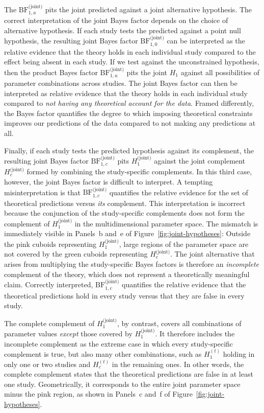 \documentclass[letterpaper,11pt,oneside]{article}
\begin{document}
The $\mathrm{BF}_{1,a}^{\text{(joint)}}$ pits the joint predicted against a joint alternative hypothesis. The correct interpretation of the joint Bayes factor depends on the choice of alternative hypothesis. If each study tests the predicted against a point null hypothesis, the resulting joint Bayes factor $\mathrm{BF}_{1,0}^{\text{(joint)}}$ can be interpreted as the relative evidence that the theory holds in each individual study compared to the effect being absent in each study. If we test against the unconstrained hypothesis, then the product Bayes factor $\mathrm{BF}_{1,u}^{\text{(joint)}}$ pits the joint $H_1$ against all possibilities of parameter combinations across studies. The joint Bayes factor can then be interpreted as relative evidence that the theory holds in each individual study compared to \textit{not having any theoretical account for the data}. Framed differently, the Bayes factor quantifies the degree to which imposing theoretical constraints improves our predictions of the data compared to not making any predictions at all.

Finally, if each study tests the predicted hypothesis against its complement, the resulting joint Bayes factor $\mathrm{BF}_{1,c}^{\text{(joint)}}$ pits $H_1^{\text{(joint)}}$ against the joint complement $H_c^{\text{(joint)}}$ formed by combining the study-specific complements. In this third case, however, the joint Bayes factor is difficult to interpret. A tempting misinterpretation is that $\mathrm{BF}_{1,c}^{\text{(joint)}}$ quantifies the relative evidence for the set of theoretical predictions versus \textit{its} complement. This interpretation is incorrect because the conjunction of the study-specific complements does not form the complement of $H_1^{\text{(joint)}}$ in the multidimensional parameter space. The mismatch is immediately visible in Panels~b and~e of Figure~\ref{fig:joint-hypotheses}: Outside the pink cuboids representing $H_1^{\text{(joint)}}$, large regions of the parameter space are not covered by the green cuboids representing $H_c^{\text{(joint)}}$. The joint alternative that arises from multiplying the study-specific Bayes factors is therefore an \textit{incomplete} complement of the theory, which does not represent a theoretically meaningful claim. Correctly interpreted, $\mathrm{BF}_{1,c}^{\text{(joint)}}$ quantifies the relative evidence that the theoretical predictions hold in every study versus that they are false in every study.

The complete complement of $H_1^{\text{(joint)}}$, by contrast, covers all combinations of parameter values \textit{except} those covered by $H_1^{\text{(joint)}}$. It therefore includes the incomplete complement as the extreme case in which every study-specific complement is true, but also many other combinations, such as $H_1^{(t)}$ holding in only one or two studies and $H_c^{(t)}$ in the remaining ones. In other words, the complete complement states that the theoretical predictions are false in at least one study. Geometrically, it corresponds to the entire joint parameter space minus the pink region, as shown in Panels~c and~f of Figure~\ref{fig:joint-hypotheses}.
\end{document}
